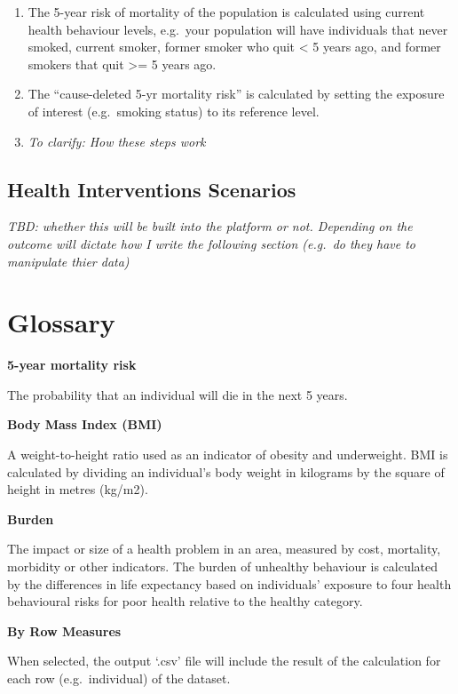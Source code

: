 \documentclass[]{book}
\begin{document}
\begin{enumerate}
\def\labelenumi{\arabic{enumi})}
\item
  The 5-year risk of mortality of the population is calculated using
  current health behaviour levels, e.g.~your population will have
  individuals that never smoked, current smoker, former smoker who quit
  \textless{} 5 years ago, and former smokers that quit \textgreater{}=
  5 years ago.
\item
  The ``cause-deleted 5-yr mortality risk'' is calculated by setting the
  exposure of interest (e.g.~smoking status) to its reference level.
\item
  \emph{To clarify: How these steps work}
\end{enumerate}

\section{Health Interventions
Scenarios}\label{health-interventions-scenarios}

\emph{TBD: whether this will be built into the platform or not.
Depending on the outcome will dictate how I write the following section
(e.g.~do they have to manipulate thier data)}

\chapter{Glossary}\label{glossary}

\textbf{5-year mortality risk}

The probability that an individual will die in the next 5 years.

\textbf{Body Mass Index (BMI)}

A weight-to-height ratio used as an indicator of obesity and
underweight. BMI is calculated by dividing an individual's body weight
in kilograms by the square of height in metres (kg/m2).

\textbf{Burden}

The impact or size of a health problem in an area, measured by cost,
mortality, morbidity or other indicators. The burden of unhealthy
behaviour is calculated by the differences in life expectancy based on
individuals' exposure to four health behavioural risks for poor health
relative to the healthy category.

\textbf{By Row Measures}

When selected, the output `.csv' file will include the result of the
calculation for each row (e.g.~individual) of the dataset.
\end{document}
